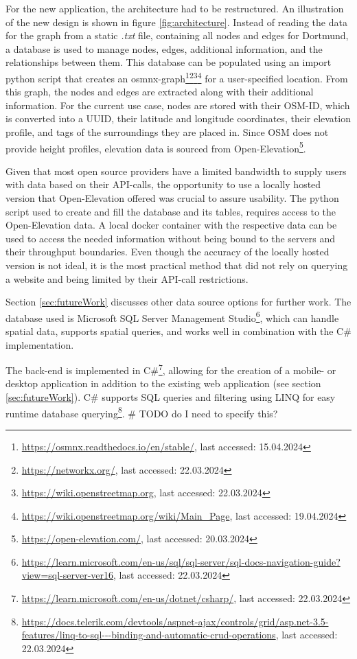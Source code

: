 For the new application, the architecture had to be restructured.
An illustration of the new design is shown in figure \ref{fig:architecture}.
Instead of reading the data for the graph from a static \textit{.txt} file, containing all nodes and edges for Dortmund, a database is used to manage nodes, edges, additional information, and the relationships between them. 
This database can be populated using an import python script that creates an osmnx-graph\footnote{\url{https://osmnx.readthedocs.io/en/stable/}, last accessed: 15.04.2024}\footnote{\url{https://networkx.org/}, last accessed: 22.03.2024}\footnote{\url{https://wiki.openstreetmap.org}, last accessed: 22.03.2024}\footnote{\url{https://wiki.openstreetmap.org/wiki/Main_Page}, last accessed: 19.04.2024} for a user-specified location. 
From this graph, the nodes and edges are extracted along with their additional information.
For the current use case, nodes are stored with their OSM-ID, which is converted into a UUID, their latitude and longitude coordinates, their elevation profile, and tags of the surroundings they are placed in.
Since OSM does not provide height profiles, elevation data is sourced from  Open-Elevation\footnote{\url{https://open-elevation.com/}, last accessed: 20.03.2024}. 

Given that most open source providers have a limited bandwidth to supply users with data based on their API-calls, the opportunity to use a locally hosted version that Open-Elevation offered was crucial to assure usability.
The python script used to create and fill the database and its tables, requires access to the Open-Elevation data.
A local docker container with the respective data can be used to access the needed information without being bound to the servers and their throughput boundaries. 
Even though the accuracy of the locally hosted version is not ideal, it is the most practical method that did not rely on querying a website and being limited by their API-call restrictions.


Section \ref{sec:futureWork} discusses other data source options for further work.
The database used is Microsoft SQL Server Management Studio\footnote{\url{https://learn.microsoft.com/en-us/sql/sql-server/sql-docs-navigation-guide?view=sql-server-ver16}, last accessed: 22.03.2024}, which can handle spatial data, supports spatial queries, and works well in combination with the C\# implementation.

The back-end is implemented in C\#\footnote{\url{https://learn.microsoft.com/en-us/dotnet/csharp/}, last accessed: 22.03.2024}, allowing for the creation of a mobile- or desktop application in addition to the existing web application (see section \ref{sec:futureWork}).
C\# supports SQL queries and filtering using LINQ for easy runtime database querying\footnote{\url{https://docs.telerik.com/devtools/aspnet-ajax/controls/grid/asp.net-3.5-features/linq-to-sql---binding-and-automatic-crud-operations}, last accessed: 22.03.2024}.
\# TODO do I need to specify this?

